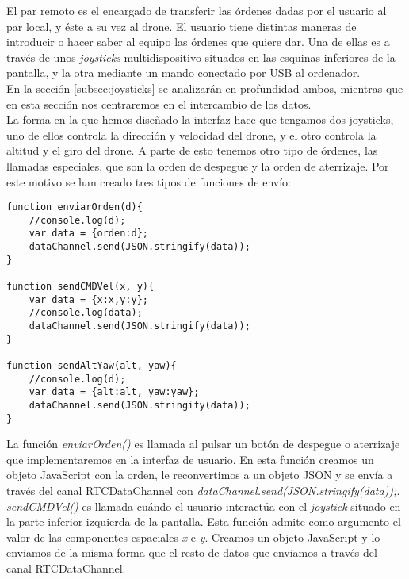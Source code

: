 El par remoto es el encargado de transferir las órdenes dadas por el usuario al par local, y éste a su vez al drone. El usuario tiene distintas maneras de introducir o hacer saber al equipo las órdenes que quiere dar. Una de ellas es a través de unos \emph{joysticks} multidispositivo situados en las esquinas inferiores de la pantalla, y la otra mediante un mando conectado por USB al ordenador.\\

En la sección \ref{subsec:joysticks} se analizarán en profundidad ambos, mientras que en esta sección nos centraremos en el intercambio de los datos.\\

La forma en la que hemos diseñado la interfaz hace que tengamos dos joysticks, uno de ellos controla la dirección y velocidad del drone, y el otro controla la altitud y el giro del drone. A parte de esto tenemos otro tipo de órdenes, las llamadas especiales, que son la orden de despegue y la orden de aterrizaje. Por este motivo se han creado tres tipos de funciones de envío:\\

\begin{lstlisting}[caption=Funciones de envío de órdenes en el par remoto.]
function enviarOrden(d){
    //console.log(d);
    var data = {orden:d};
    dataChannel.send(JSON.stringify(data));
}

function sendCMDVel(x, y){
    var data = {x:x,y:y};
    //console.log(data);
    dataChannel.send(JSON.stringify(data));
}

function sendAltYaw(alt, yaw){
    //console.log(d);
    var data = {alt:alt, yaw:yaw};
    dataChannel.send(JSON.stringify(data));
}
\end{lstlisting}

La función \emph{enviarOrden()} es llamada al pulsar un botón de despegue o aterrizaje que implementaremos en la interfaz de usuario. En esta función creamos un objeto JavaScript con la orden, le reconvertimos a un objeto JSON y se envía a través del canal RTCDataChannel con \emph{dataChannel.send(JSON.stringify(data));}.\\


\emph{sendCMDVel()} es llamada cuándo el usuario interactúa con el \emph{joystick} situado en la parte inferior izquierda de la pantalla. Esta función admite como argumento el valor de las componentes espaciales \emph{x} e \emph{y}. Creamos un objeto JavaScript y lo enviamos de la misma forma que el resto de datos que enviamos a través del canal RTCDataChannel.\\

